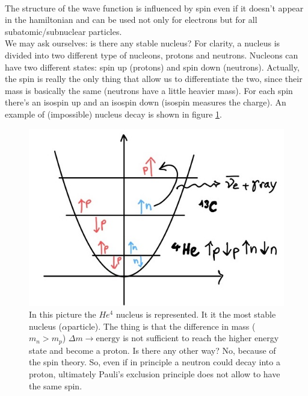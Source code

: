 \\
The structure of the wave function is influenced by spin even if it doesn't appear in the hamiltonian and can be used not only for electrons but for all subatomic/subnuclear particles. \\
We may ask ourselves: is there any stable nucleus? For clarity, a nucleus is divided into two different type of nucleons, protons and neutrons. Nucleons can have two different states: spin up (protons) and spin down (neutrons). Actually, the spin is really the only thing that allow us to differentiate the two, since their mass is basically the same (neutrons have a little heavier mass). For each spin there's an isospin up and an isospin down (isospin measures the charge). An example of (impossible) nucleus decay is shown in figure \ref{fig:decay}.\\
\begin{figure}[htbp!]
	\centering
	\includegraphics[scale=0.20]{img_7}
	\caption{In this picture the $He^4$ nucleus is represented. It it the most stable nucleus ($\alpha$particle). The thing is that the difference in mass ($m_n > m_p$) $\Delta m \rightarrow \text{energy}$ is not sufficient to reach the higher energy state and become a proton. Is there any other way? No, because of the spin theory. So, even if in principle a neutron could decay into a proton, ultimately Pauli's exclusion principle does not allow to have the same spin.}
	\label{fig:decay}
\end{figure}\\


